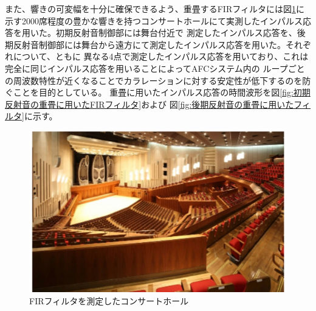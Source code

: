 \documentclass[11pt,a4j]{jreport}
\begin{document}
    また、響きの可変幅を十分に確保できるよう、重畳するFIRフィルタには図\ref{fig:FIRフィルタを測定したコンサートホール}に
    示す2000席程度の豊かな響きを持つコンサートホールにて実測したインパルス応答を用いた。初期反射音制御部には舞台付近で
    測定したインパルス応答を、後期反射音制御部には舞台から遠方にて測定したインパルス応答を用いた。それぞれについて、ともに
    異なる4点で測定したインパルス応答を用いており、これは完全に同じインパルス応答を用いることによってAFCシステム内の
    ループごとの周波数特性が近くなることでカラレーションに対する安定性が低下するのを防ぐことを目的としている。
    重畳に用いたインパルス応答の時間波形を図\ref{fig:初期反射音の重畳に用いたFIRフィルタ}および
    図\ref{fig:後期反射音の重畳に用いたフィルタ}に示す。

    \begin{figure}[H]
      \centering
      \includegraphics[width=.6\linewidth]{images/convolutedIrHall.jpg}
      \caption{FIRフィルタを測定したコンサートホール}
      \label{fig:FIRフィルタを測定したコンサートホール}
    \end{figure}
\end{document}
